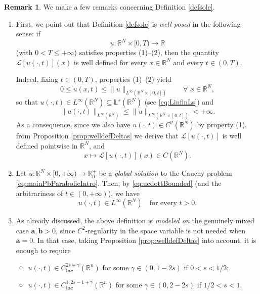 \documentclass[11pt,a4paper,reqno]{amsart}
\def \R {\mathbb{R}}
\def \LL {\mathcal{L}}
\theoremstyle{definition}
\newtheorem{remark}[definition]{Remark}
\theoremstyle{plain}
\numberwithin{equation}{section}
\begin{document}
\begin{remark} \label{rem:DefWellPosed}
We make a few remarks concerning Definition \ref{defsole}.

\begin{enumerate}
	\item First, we point out that Definition \ref{defsole} is \emph{well posed} in the following sense: if
 $$u:\mathbb{R}^N\times [0,T)\to\mathbb{R}$$
 (with $0<T\leq+\infty$) satisfies properties (1)--(2), then the quantity
	$\LL[u(\cdot,t)](x)$
	is well defined for every $x\in\mathbb{R}^N$ and every $t\in (0,T)$.
	\vspace{0.1cm}

	Indeed, fixing $t\in (0,T)$, properties (1)--(2) yield
	$$0\leq u(x,t)\leq \|u\|_{L^\infty(\mathbb{R}^N\times[0,t])}
	\qquad \forall\,\,x\in\mathbb{R}^N,$$
	so that $u(\cdot,t)\in L^\infty(\mathbb{R}^N)\subseteq \mathbb{L}^s(\mathbb{R}^N)$ (see \eqref{eq:LinfinLs}) and
	\begin{equation} \label{eq:ucdottBounded}
	\|u(\cdot,t)\|_{L^\infty(\mathbb{R}^N)} \leq \|u\|_{L^\infty(\mathbb{R}^N\times[0,t])}<+\infty.
	\end{equation}	
	As a consequence, since we also have $u(\cdot,t)\in C^2(\mathbb{R}^N)$ by property (1),  from Proposition \ref{prop:welldefDeltas} we derive that $\LL[u(\cdot,t)]$ is well defined pointwise in $\mathbb{R}^N$, and
	$$x\mapsto \LL[u(\cdot,t)](x)\in C(\mathbb{R}^N).$$

	\item Let $u:\mathbb{R}^N\times[0,+\infty)\to \mathbb{R}^+_0$ be a \emph{global solution} to the Cauchy problem \eqref{eq:mainPbParabolicIntro}. Then, by \eqref{eq:ucdottBounded} (and the arbitrariness of $t\in(0,+\infty)$), we have
	$$u(\cdot,t)\in L^\infty(\mathbb{R}^N)\quad \text{for every } t>0.$$
	
	\item As already discussed, the above definition is \emph{modeled on} the genuinely mixed case $\mathbf{a},\mathbf{b}>0$, since $C^2$-regularity in the space variable is not needed when $\mathbf{a}=0$. In that case, taking Proposition \ref{prop:welldefDeltas} into account, it is enough to require
\begin{itemize}
	\item 
	$u(\cdot,t)\in C^{2s+\gamma}_{\mathbf{loc}}(\R^n)$
	for some $\gamma\in (0,1-2s)$ if $0<s<1/2$;
	\vspace{0.2cm}
	
	\item $u(\cdot,t)\in C^{1,2s-1+\gamma}_{\mathbf{loc}}(\R^n)$
	for some $\gamma\in (0,2-2s)$ if $1/2<s<1$.
	\end{itemize}
\end{enumerate}
\end{remark}
\end{document}
